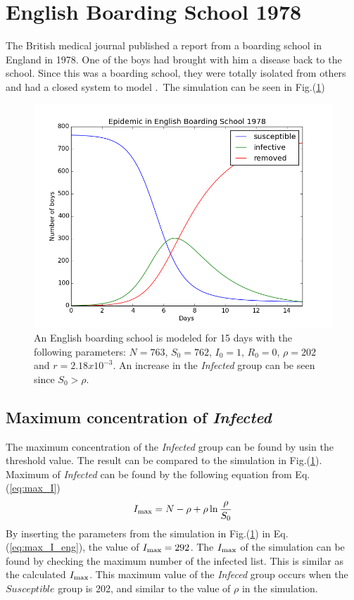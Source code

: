\documentclass[%
twoside,                 %
final,                   %
chapterprefix=true,      %
open=right               %
10pt]{book}
\begin{document}
\section{English Boarding School 1978}
The British medical journal published a report from a boarding school in England in 1978. One of the boys had brought with him a disease back to the school. Since this was a boarding school, they were totally isolated from others and had a closed system to model \cite[p.~325]{murray2002mathematical}.~The simulation can be seen in Fig.(\ref{fig:english_boarding})  


\begin{figure}[ht]
  \centerline{\includegraphics[width=0.9\linewidth]{1_fig/English_boarding_school.png}}
  \caption{
  \label{fig:english_boarding} An English boarding school is modeled for 15 days with the following parameters: $N=763$, $S_0=762$, $I_0=1$, $R_0=0$, $\rho=202$ and $r=2.18 x 10^{-3}$. An increase in the \emph{Infected} group can be seen since $S_0 > \rho$.
  }
\end{figure}


\subsection{Maximum concentration of \emph{Infected}}
The maximum concentration of the \emph{Infected} group can be found by usin the threshold value. The result can be compared to the simulation in Fig.(\ref{fig:english_boarding}). Maximum of \emph{Infected} can be found by the following equation from Eq.(\ref{eq:max_I})
\begin{equation} \label{eq:max_I_eng}
I_{\textrm{max}}= N - \rho + \rho \ln\frac{\rho}{S_0} 
\end{equation}
By inserting the parameters from the simulation in Fig.(\ref{fig:english_boarding}) in Eq.(\ref{eq:max_I_eng}), the value of $I_{\textrm{max}} = 292$. The $I_{\textrm{max}}$ of the simulation can be found by checking the maximum number of the infected list. This is similar as the calculated $I_{\textrm{max}}$. This maximum value of the \emph{Infeced} group occurs when the $Susceptible$ group is 202, and similar to the value of $\rho$ in the simulation.
\end{document}
